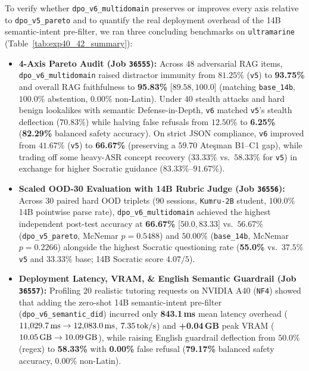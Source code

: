 \documentclass[a4paper,12pt]{report}
\begin{document}
To verify whether \texttt{dpo\_v6\_multidomain} preserves or improves every axis relative to \texttt{dpo\_v5\_pareto} and to quantify the real deployment overhead of the 14B semantic-intent pre-filter, we ran three concluding benchmarks on \texttt{ultramarine} (Table~\ref{tab:exp40_42_summary}):
\begin{itemize}
    \item \textbf{4-Axis Pareto Audit (Job \texttt{36555}):} Across $48$ adversarial RAG items, \texttt{dpo\_v6\_multidomain} raised distractor immunity from $81.25\%$ (\texttt{v5}) to \textbf{93.75\%} and overall RAG faithfulness to \textbf{95.83\%} [$89.58, 100.0$] (matching \texttt{base\_14b}, $100.0\%$ abstention, $0.00\%$ non-Latin). Under $40$ stealth attacks and hard benign lookalikes with semantic Defense-in-Depth, \texttt{v6} matched \texttt{v5}'s stealth deflection ($70.83\%$) while halving false refusals from $12.50\%$ to \textbf{6.25\%} (\textbf{82.29\%} balanced safety accuracy). On strict JSON compliance, \texttt{v6} improved from $41.67\%$ (\texttt{v5}) to \textbf{66.67\%} (preserving a $59.70$ Ate\c{s}man B1--C1 gap), while trading off some heavy-ASR concept recovery ($33.33\%$ vs.\ $58.33\%$ for \texttt{v5}) in exchange for higher Socratic guidance ($83.33\%$--$91.67\%$).
    \item \textbf{Scaled OOD-30 Evaluation with 14B Rubric Judge (Job \texttt{36556}):} Across $30$ paired hard OOD triplets ($90$ sessions, \texttt{Kumru-2B} student, $100.0\%$ 14B pointwise parse rate), \texttt{dpo\_v6\_multidomain} achieved the highest independent post-test accuracy at \textbf{66.67\%} [$50.0, 83.33$] vs.\ $56.67\%$ (\texttt{dpo\_v5\_pareto}, McNemar $p=0.5488$) and $50.00\%$ (\texttt{base\_14b}, McNemar $p=0.2266$) alongside the highest Socratic questioning rate (\textbf{55.0\%} vs.\ $37.5\%$ \texttt{v5} and $33.33\%$ base; 14B Socratic score $4.07/5$).
    \item \textbf{Deployment Latency, VRAM, \& English Semantic Guardrail (Job \texttt{36557}):} Profiling $20$ realistic tutoring requests on NVIDIA A40 (\texttt{NF4}) showed that adding the zero-shot 14B semantic-intent pre-filter (\texttt{dpo\_v6\_semantic\_did}) incurred only \textbf{843.1\,ms} mean latency overhead ($11{,}029.7\text{\,ms} \to 12{,}083.0\text{\,ms}$, $7.35\text{\,tok/s}$) and \textbf{+0.04\,GB} peak VRAM ($10.05\text{\,GB} \to 10.09\text{\,GB}$), while raising English guardrail deflection from $50.0\%$ (regex) to \textbf{58.33\%} with \textbf{0.00\%} false refusal (\textbf{79.17\%} balanced safety accuracy, $0.00\%$ non-Latin).
\end{itemize}
\end{document}
